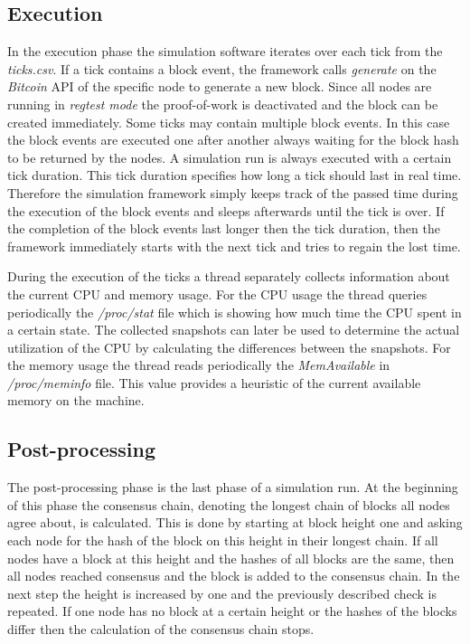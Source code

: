 \subsection{Execution}

In the execution phase the simulation software iterates over each tick from the \textit{ticks.csv}.
If a tick contains a block event, the framework calls \textit{generate} on the \textit{Bitcoin} API of the specific node to generate a new block.
Since all nodes are running in \textit{regtest mode} the proof-of-work is deactivated and the block can be created immediately.
Some ticks may contain multiple block events.
In this case the block events are executed one after another always waiting for the block hash to be returned by the nodes.
A simulation run is always executed with a certain tick duration.
This tick duration specifies how long a tick should last in real time.
Therefore the simulation framework simply keeps track of the passed time during the execution of the block events and sleeps afterwards until the tick is over.
If the completion of the block events last longer then the tick duration, then the framework immediately starts with the next tick and tries to regain the lost time.

During the execution of the ticks a thread separately collects information about the current CPU and memory usage.
For the CPU usage the thread queries periodically the \textit{/proc/stat} file which is showing how much time the CPU spent in a certain state. 
The collected snapshots can later be used to determine the actual utilization of the CPU by calculating the differences between the snapshots.
For the memory usage the thread reads periodically the \textit{MemAvailable} in \textit{/proc/meminfo} file.
This value provides a heuristic of the current available memory on the machine.

\subsection{Post-processing}

The post-processing phase is the last phase of a simulation run.
At the beginning of this phase the consensus chain, denoting the longest chain of blocks all nodes agree about, is calculated.
This is done by starting at block height one and asking each node for the hash of the block on this height in their longest chain.
If all nodes have a block at this height and the hashes of all blocks are the same, then all nodes reached consensus and the block is added to the consensus chain.
In the next step the height is increased by one and the previously described check is repeated.
If one node has no block at a certain height or the hashes of the blocks differ then the calculation of the consensus chain stops.

